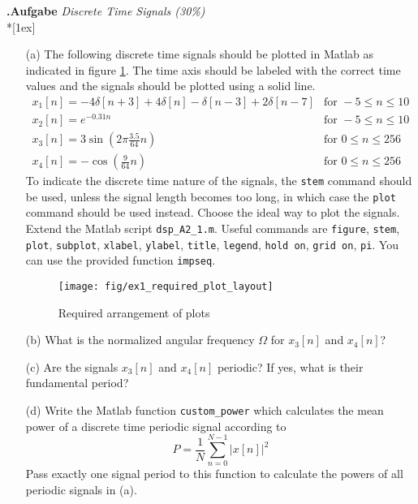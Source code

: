 \documentclass[12pt,a4paper,austrian]{article}
\newcounter{theaufgabe}\setcounter{theaufgabe}{1}
\newenvironment{aufgabe}[1]%
  {\bigskip\par\noindent\begin{nopagebreak}
   \textsf{\textbf{\arabic{theaufgabe}.\thinspace Aufgabe}}\quad
      \textsf{\textit{#1}}\\*[1ex]%
\stepcounter{theaufgabe}\hspace{2ex}\end{nopagebreak}}
  {\par\pagebreak[2]}
\begin{document}
\begin{aufgabe}{Discrete Time Signals (30\%)}

\begin{enumerate}

\item[(a)]
The following discrete time signals should be plotted in Matlab as indicated in figure \ref{fig:ex1_required_plot_layout}.
The time axis should be labeled with the correct time values and the signals should be plotted using a solid line.
\[
\begin{array}{ll}
x_{1}[n] = -4 \delta[n+3] + 4 \delta[n] - \delta[n-3] + 2 \delta[n-7] & \text{for } -5 \leq n \leq 10 \\
x_{2}[n] = e^{-0.31 n} & \text{for } -5 \leq n \leq 10 \\
x_{3}[n] = 3 \sin \left(2 \pi \frac{3.5}{64} n\right) & \text{for } 0 \leq n \leq 256 \\
x_{4}[n] = -\cos \left(\frac{9}{64} n\right) & \text{for } 0 \leq n \leq 256
\end{array}
\]
To indicate the discrete time nature of the signals, the \texttt{stem} command should be used, unless the signal length becomes too long, in which case the \texttt{plot} command should be used instead.
Choose the ideal way to plot the signals.
Extend the Matlab script \texttt{dsp\_A2\_1.m}.
Useful commands are \texttt{figure}, \texttt{stem}, \texttt{plot}, \texttt{subplot}, \texttt{xlabel}, \texttt{ylabel}, \texttt{title}, \texttt{legend}, \texttt{hold on}, \texttt{grid on}, \texttt{pi}.
You can use the provided function \texttt{impseq}.

\begin{figure}[h]
\centering
\texttt{[image: fig/ex1\_required\_plot\_layout]}
\caption{Required arrangement of plots}
\label{fig:ex1_required_plot_layout}
\end{figure}

\item[(b)]
What is the normalized angular frequency $\Omega$ for $x_{3}[n]$ and $x_{4}[n]$?

\item[(c)]
Are the signals $x_{3}[n]$ and $x_{4}[n]$ periodic? If yes, what is their fundamental period?

\item[(d)]
Write the Matlab function \texttt{custom\_power} which calculates the mean power of a discrete time periodic signal according to
\[ P = \frac{1}{N} \sum_{n=0}^{N-1} |x[n]|^2 \]
Pass exactly one signal period to this function to calculate the powers of all periodic signals in (a).


\end{enumerate}
\end{aufgabe}
\end{document}

